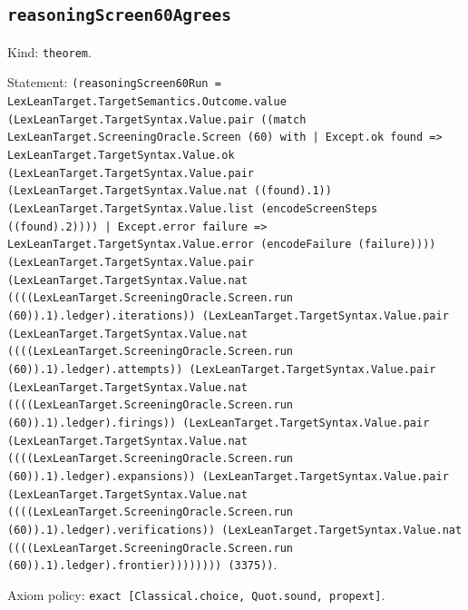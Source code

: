 \documentclass[11pt]{article}
\begin{document}
\subsection*{\texttt{reasoningScreen60Agrees}}
\noindent Kind: \texttt{theorem}.\par
\noindent Statement: \texttt{(reasoningScreen60Run = LexLeanTarget.TargetSemantics.Outcome.value (LexLeanTarget.TargetSyntax.Value.pair ((match LexLeanTarget.ScreeningOracle.Screen (60) with | Except.ok found => LexLeanTarget.TargetSyntax.Value.ok (LexLeanTarget.TargetSyntax.Value.pair (LexLeanTarget.TargetSyntax.Value.nat ((found).1)) (LexLeanTarget.TargetSyntax.Value.list (encodeScreenSteps ((found).2)))) | Except.error failure => LexLeanTarget.TargetSyntax.Value.error (encodeFailure (failure)))) (LexLeanTarget.TargetSyntax.Value.pair (LexLeanTarget.TargetSyntax.Value.nat ((((LexLeanTarget.ScreeningOracle.Screen.run (60)).1).ledger).iterations)) (LexLeanTarget.TargetSyntax.Value.pair (LexLeanTarget.TargetSyntax.Value.nat ((((LexLeanTarget.ScreeningOracle.Screen.run (60)).1).ledger).attempts)) (LexLeanTarget.TargetSyntax.Value.pair (LexLeanTarget.TargetSyntax.Value.nat ((((LexLeanTarget.ScreeningOracle.Screen.run (60)).1).ledger).firings)) (LexLeanTarget.TargetSyntax.Value.pair (LexLeanTarget.TargetSyntax.Value.nat ((((LexLeanTarget.ScreeningOracle.Screen.run (60)).1).ledger).expansions)) (LexLeanTarget.TargetSyntax.Value.pair (LexLeanTarget.TargetSyntax.Value.nat ((((LexLeanTarget.ScreeningOracle.Screen.run (60)).1).ledger).verifications)) (LexLeanTarget.TargetSyntax.Value.nat ((((LexLeanTarget.ScreeningOracle.Screen.run (60)).1).ledger).frontier)))))))) (3375))}.\par
\noindent Axiom policy: \texttt{exact [Classical.choice, Quot.sound, propext]}.\par
\end{document}
